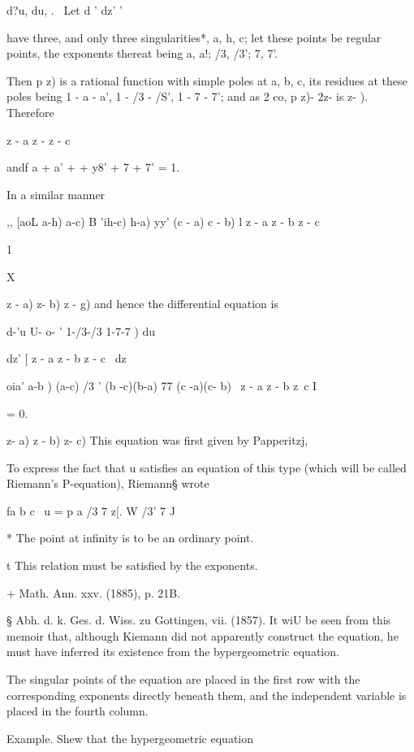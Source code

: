 
d?u, du, . \ Let d ' dz' '

have three, and only three singularities*, a, h, c; let these points
be regular points, the exponents thereat being a, a!; /3, /3'; 7,
7'.

Then p z) is a rational function with simple poles at a, b, c, its
residues at these poles being 1 - a - a', 1 - /3 - /S', 1 - 7 - 7';
and as 2 co, p z)- 2z- is z- ). Therefore

  z - a z - z - c

andf a + a' + + y8' + 7 + 7' = 1.

In a similar manner

,, [aoL a-h) a-c) B 'ih-c) h-a) yy' (c - a) c - b) l z - a z - b z - c

1

X

 z - a) z- b) z - g) and hence the differential equation is

d-'u U- o- ' 1-/3-/3 1-7-7 ) du

dz' [ z - a z - b z - c \ dz

  oia' a-b ) (a-c) /3 ' (b -c)(b-a) 77 (c -a)(c- b) \ z - a z - b z~c
I

= 0.

 z- a) z - b) z- c) This equation was first given by Papperitzj,

To express the fact that u satisfies an equation of this type (which
will be called Riemann's P-equation), Riemann§ wrote

fa b c \ u = p a /3 7 z[. W /3' 7 J

* The point at infinity is to be an ordinary point.

t This relation must be satisfied by the exponents.

+ Math. Ann. xxv. (1885), p. 21B.

§ Abh. d. k. Ges. d. Wiss. zu Gottingen, vii. (1857). It wiU be seen
from this memoir that, although Kiemann did not apparently construct
the equation, he must have inferred its existence from the
bypergeometric equation.

%
%

The singular points of the equation are placed in the first row with
the corresponding exponents directly beneath them, and the independent
variable is placed in the fourth column.

Example. Shew that the hypergeometric equation

